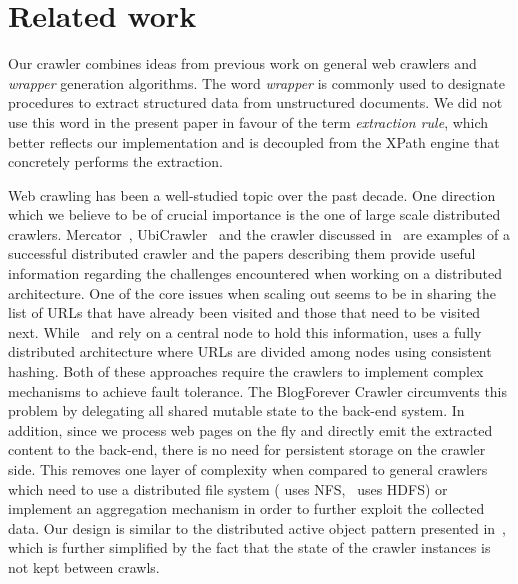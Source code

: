 \section{Related work}
\label{relatedwork}

Our crawler combines ideas from previous work on general web crawlers and \emph{wrapper} generation algorithms. The word \emph{wrapper} is commonly used to designate procedures to extract structured data from unstructured documents. We did not use this word in the present paper in favour of the term \emph{extraction rule}, which better reflects our implementation and is decoupled from the XPath engine that concretely performs the extraction.

Web crawling has been a well-studied topic over the past decade. One direction which we believe to be of crucial importance is the one of large scale distributed crawlers. Mercator~\cite{heydon99mercator}, UbiCrawler~\cite{boldi2003} and the crawler discussed in~\cite{shkapenyuk2002} are examples of a successful distributed crawler and the papers describing them provide useful information regarding the challenges encountered when working on a distributed architecture. One of the core issues when scaling out seems to be in sharing the list of URLs that have already been visited and those that need to be visited next. While~\cite{heydon99mercator} and \cite{shkapenyuk2002} rely on a central node to hold this information, \cite{boldi2003} uses a fully distributed architecture where URLs are divided among nodes using consistent hashing. Both of these approaches require the crawlers to implement complex mechanisms to achieve fault tolerance. The BlogForever Crawler circumvents this problem by delegating all shared mutable state to the back-end system. In addition, since we process web pages on the fly and directly emit the extracted content to the back-end, there is no need for persistent storage on the crawler side. This removes one layer of complexity when compared to general crawlers which need to use a distributed file system (\cite{shkapenyuk2002} uses NFS,~\cite{berger2011} uses HDFS) or implement an aggregation mechanism in order to further exploit the collected data. Our design is similar to the distributed active object pattern presented in~\cite{activeobject1996}, 
which is further simplified by the fact that the state of the crawler instances is not kept between crawls.

